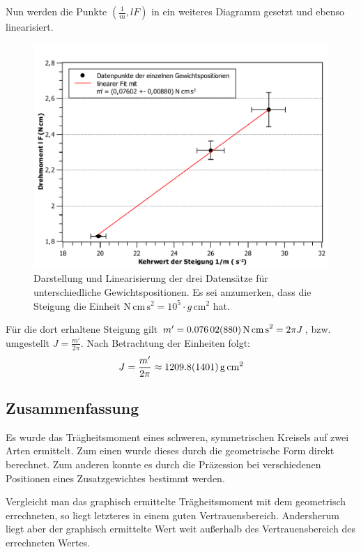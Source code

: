 	Nun werden die Punkte $(\frac{1}{m}, lF)$ in ein weiteres Diagramm gesetzt und ebenso linearisiert.
	\begin{figure}[ht]
		\centering
		\includegraphics[width=\textwidth]{kreisel_gewichte.pdf}
		\caption{Darstellung und Linearisierung der drei Datensätze für unterschiedliche Gewichtspositionen. Es sei anzumerken, dass die Steigung die Einheit $\si{\newton\,\centi\meter\,\second\squared} = 10^5\cdot \si{g\,\centi\meter^2}$ hat.}
		\label{abb:gewichte}	
	\end{figure}
	Für die dort erhaltene Steigung gilt $m' = \SI{0,07602 +- 0,00880}{\newton\,\centi\meter\,\second\squared} = 2\pi J$, bzw. umgestellt $J = \frac{m'}{2\pi}$.
	Nach Betrachtung der Einheiten folgt:
	\begin{equation}
		J = \frac{m'}{2\pi} \approx \SI{1209,8 +- 140,1}{g\,\centi\meter\squared}
	\end{equation}
	

\subsection{Zusammenfassung}

Es wurde das Trägheitsmoment eines schweren, symmetrischen Kreisels auf zwei Arten ermittelt.
Zum einen wurde dieses durch die geometrische Form direkt berechnet.
Zum anderen konnte es durch die Präzession bei verschiedenen Positionen eines Zusatzgewichtes bestimmt werden.

Vergleicht man das graphisch ermittelte Trägheitsmoment mit dem geometrisch errechneten, so liegt letzteres in einem guten Vertrauensbereich.
Andersherum liegt aber der graphisch ermittelte Wert weit außerhalb des Vertrauensbereich des errechneten Wertes.

